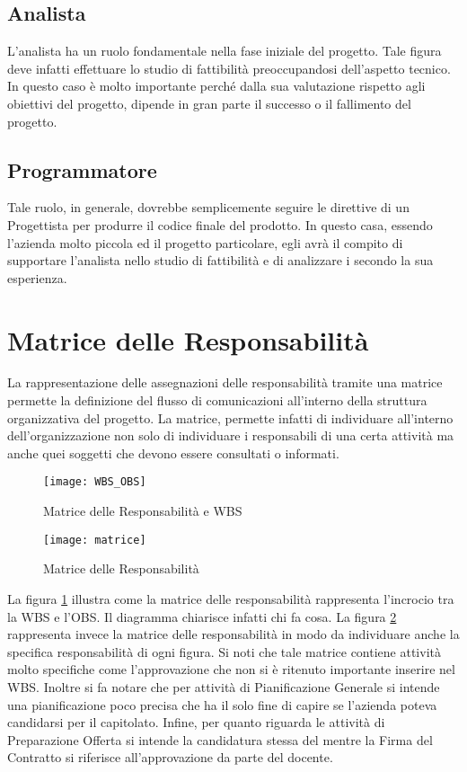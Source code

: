\subsection{Analista}
	L'analista ha un ruolo fondamentale nella fase iniziale del progetto. Tale figura deve infatti effettuare lo studio di fattibilità preoccupandosi dell'aspetto tecnico. In questo caso è molto importante perché dalla sua valutazione rispetto agli obiettivi del progetto, dipende in gran parte il successo o il fallimento del progetto.
\subsection{Programmatore}
	 Tale ruolo, in generale, dovrebbe semplicemente seguire le direttive di un Progettista per produrre il codice finale del prodotto. In questo casa, essendo l'azienda molto piccola ed il progetto particolare, egli avrà il compito di supportare l'analista nello studio di fattibilità e di analizzare i  secondo la sua esperienza.




\section{Matrice delle Responsabilità}
La rappresentazione delle assegnazioni delle responsabilità tramite una matrice permette la definizione del flusso di comunicazioni all'interno della struttura organizzativa del progetto. La matrice, permette infatti di individuare all'interno dell'organizzazione non solo di individuare i responsabili di una certa attività ma anche quei soggetti che devono essere consultati o informati.



\begin{figure}[!htb]
  \texttt{[image: WBS\_OBS]}
	\caption{Matrice delle Responsabilità e WBS}
	\label{fig: WBS_OBS}
\end{figure} 


\begin{figure}[!htb]
  \texttt{[image: matrice]}
  	\label{fig:matrice}
	\caption{Matrice delle Responsabilità}
\end{figure}

La figura \ref{fig: WBS_OBS} illustra come la matrice delle responsabilità rappresenta l'incrocio tra la WBS e l'OBS. Il diagramma chiarisce infatti chi fa cosa.
La figura \ref{fig:matrice} rappresenta invece la matrice delle responsabilità in modo da individuare anche la specifica responsabilità di ogni figura. Si noti che tale matrice contiene attività molto specifiche come l'approvazione che non si è ritenuto importante inserire nel WBS. Inoltre si fa notare che per attività di Pianificazione Generale si intende una pianificazione poco precisa che ha il solo fine di capire se l'azienda poteva candidarsi per il capitolato. Infine, per quanto riguarda le attività di Preparazione Offerta si intende la candidatura stessa del  mentre la Firma del Contratto si riferisce all'approvazione da parte del docente.


